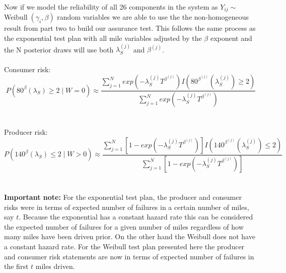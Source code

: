 \documentclass{article}
\begin{document}
\noindent
Now if we model the reliability of all 26 components in the system as $Y_{ij} \sim$ Weibull$\;(\gamma_i, \beta) $ random variables we are able to use the the non-homogeneous result from part two to build our assurance test. This follows the same process as the exponential test plan with all mile variables adjusted by the $\beta$ exponent and the N posterior draws will use both $\lambda_S^{(j)}$ and $\beta^{(j)}$.
\\
\\
Consumer risk:
\\
$$
	 P(80^\beta (\lambda_S) \geq 2 \; \vert \; W = 0) \approx \frac{\sum_{j = 1}^{N} exp(-\lambda_S^{(j)} T^{\beta^{(j)}})I(80^{\beta^{(j)}} (\lambda_S^{(j)}) \geq 2)} {\sum_{j = 1}^{N} exp(-\lambda_S^{(j)} T^{\beta^{(j)}})}
$$
\\
\\
Producer risk:
\\
$$
	 P(140^\beta (\lambda_S) \leq 2 \; \vert \; W > 0) \approx  \frac{\sum_{j = 1}^{N} [1 - exp(-\lambda_S^{(j)} T^{\beta^{(j)}})] I(140^{\beta^{(j)}} (\lambda_S^{(j)}) \leq 2)} {\sum_{j = 1}^{N} [1 - exp(-\lambda_S^{(j)} T^{\beta^{(j)}})]}
$$
\\
\\
\textbf{Important note:} For the exponential test plan, the producer and consumer risks were in terms of expected number of failures in a certain number of miles, say $t$.  Because the exponential has a constant hazard rate this can be considered the expected number of failures for a given number of miles regardless of how many miles have been driven prior.  On the other hand the Weibull does not have a constant hazard rate.  For the Weibull test plan presented here the producer and consumer risk statements are now in terms of expected number of failures in the first $t$ miles driven.
\end{document}
